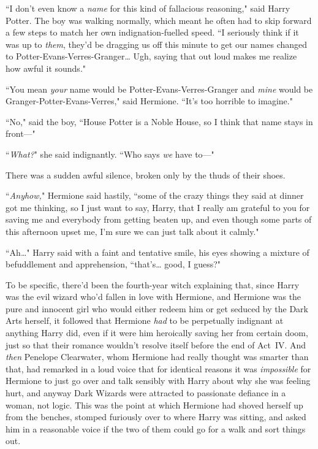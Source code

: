 ``I don't even know a \emph{name} for this kind of fallacious reasoning," said Harry Potter. The boy was walking normally, which meant he often had to skip forward a few steps to match her own indignation-fuelled speed. ``I seriously think if it was up to \emph{them}, they'd be dragging us off this minute to get our names changed to Potter-Evans-Verres-Granger{\ldots} Ugh, saying that out loud makes me realize how awful it sounds."

``You mean \emph{your} name would be Potter-Evans-Verres-Granger and \emph{mine} would be Granger-Potter-Evans-Verres," said Hermione. ``It's too horrible to imagine."

``No," said the boy, ``House Potter is a Noble House, so I think that name stays in front—"

``\emph{What?}" she said indignantly. ``Who says \emph{we} have to—"

There was a sudden awful silence, broken only by the thuds of their shoes.

``\emph{Anyhow,}" Hermione said hastily, ``some of the crazy things they said at dinner got me thinking, so I just want to say, Harry, that I really am grateful to you for saving me and everybody from getting beaten up, and even though some parts of this afternoon upset me, I'm sure we can just talk about it calmly."

``Ah{\ldots}" Harry said with a faint and tentative smile, his eyes showing a mixture of befuddlement and apprehension, ``that's{\ldots} good, I guess?"

To be specific, there'd been the fourth-year witch explaining that, since Harry was the evil wizard who'd fallen in love with Hermione, and Hermione was the pure and innocent girl who would either redeem him or get seduced by the Dark Arts herself, it followed that Hermione \emph{had} to be perpetually indignant at anything Harry did, even if it were him heroically saving her from certain doom, just so that their romance wouldn't resolve itself before the end of Act~IV. And \emph{then} Penelope Clearwater, whom Hermione had really thought was smarter than that, had remarked in a loud voice that for identical reasons it was \emph{impossible} for Hermione to just go over and talk sensibly with Harry about why she was feeling hurt, and anyway Dark Wizards were attracted to passionate defiance in a woman, not logic. This was the point at which Hermione had shoved herself up from the benches, stomped furiously over to where Harry was sitting, and asked him in a reasonable voice if the two of them could go for a walk and sort things out.

